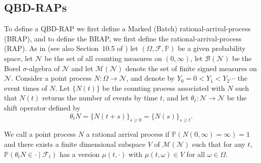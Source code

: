 %
%

\subsection{QBD-RAPs}\label{sec: qbd-rap}

To define a QBD-RAP we first define a Marked (Batch) rational-arrival-process (BRAP), and to define the BRAP, we first define the rational-arrival-process (RAP). As in \citep{ab1999} (see also Section~10.5 of \cite{MEinAP}) let \((\Omega, \mathcal F, \mathbb P)\) be a given probability space, let \(\mathscr N\) be the set of all counting measures on \((0,\infty)\), let \(\mathscr B(\mathscr N)\) be the Borel \(\sigma\)-algebra of \(\mathscr N\) and let \(\mathscr M(\mathscr N)\) denote the set of finite signed measures on \(\mathscr N\). Consider a point process \(N:\Omega\to\mathscr N\), and denote by \(Y_0=0<Y_1<Y_2\cdots\) the event times of \(N\). Let \(\{N(t)\}\) be the counting process associated with \(N\) such that \(N(t)\) returns the number of events by time \(t\), and let \(\theta_t:\mathscr N \to\mathscr N\) be the shift operator defined by \[\theta_t N=\{N(t+s)\}_{s\geq 0}=\{N(s)\}_{s\geq t}.\] 
\begin{defn}[\cite{ab1999}]
	We call a point process \(N\) a rational arrival process if \(\mathbb P(N(0,\infty)=\infty)=1\) and there exists a finite dimensional subspace \(V\) of \(\mathscr M(\mathscr N)\) such that for any \(t\), \(\mathbb P(\theta_tN\in\cdot\mid \mathcal F_t)\) has a version \(\mu(t,\cdot)\) with \(\mu(t,\omega)\in V\) for all \(\omega\in\Omega\). 
\end{defn}

